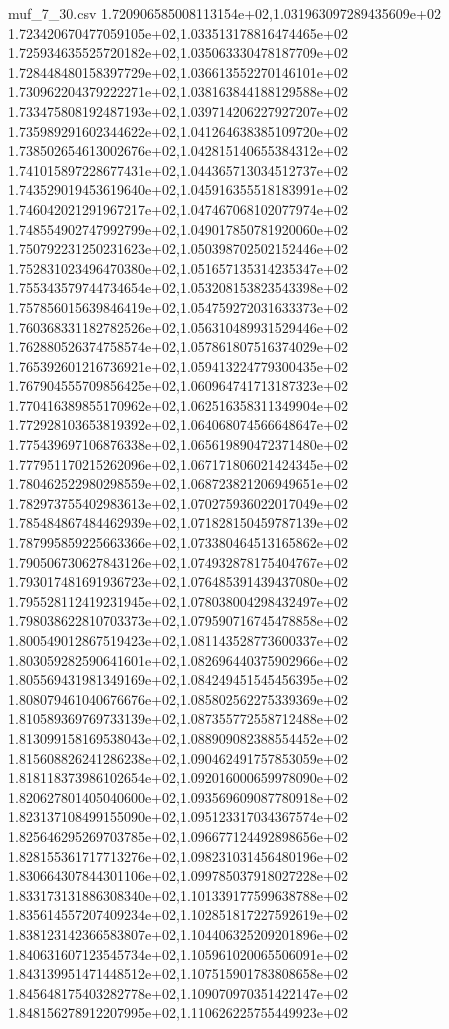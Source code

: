 \begin{filecontents*}{muf_7_30.csv}
1.720906585008113154e+02,1.031963097289435609e+02
1.723420670477059105e+02,1.033513178816474465e+02
1.725934635525720182e+02,1.035063330478187709e+02
1.728448480158397729e+02,1.036613552270146101e+02
1.730962204379222271e+02,1.038163844188129588e+02
1.733475808192487193e+02,1.039714206227927207e+02
1.735989291602344622e+02,1.041264638385109720e+02
1.738502654613002676e+02,1.042815140655384312e+02
1.741015897228677431e+02,1.044365713034512737e+02
1.743529019453619640e+02,1.045916355518183991e+02
1.746042021291967217e+02,1.047467068102077974e+02
1.748554902747992799e+02,1.049017850781920060e+02
1.750792231250231623e+02,1.050398702502152446e+02
1.752831023496470380e+02,1.051657135314235347e+02
1.755343579744734654e+02,1.053208153823543398e+02
1.757856015639846419e+02,1.054759272031633373e+02
1.760368331182782526e+02,1.056310489931529446e+02
1.762880526374758574e+02,1.057861807516374029e+02
1.765392601216736921e+02,1.059413224779300435e+02
1.767904555709856425e+02,1.060964741713187323e+02
1.770416389855170962e+02,1.062516358311349904e+02
1.772928103653819392e+02,1.064068074566648647e+02
1.775439697106876338e+02,1.065619890472371480e+02
1.777951170215262096e+02,1.067171806021424345e+02
1.780462522980298559e+02,1.068723821206949651e+02
1.782973755402983613e+02,1.070275936022017049e+02
1.785484867484462939e+02,1.071828150459787139e+02
1.787995859225663366e+02,1.073380464513165862e+02
1.790506730627843126e+02,1.074932878175404767e+02
1.793017481691936723e+02,1.076485391439437080e+02
1.795528112419231945e+02,1.078038004298432497e+02
1.798038622810703373e+02,1.079590716745478858e+02
1.800549012867519423e+02,1.081143528773600337e+02
1.803059282590641601e+02,1.082696440375902966e+02
1.805569431981349169e+02,1.084249451545456395e+02
1.808079461040676676e+02,1.085802562275339369e+02
1.810589369769733139e+02,1.087355772558712488e+02
1.813099158169538043e+02,1.088909082388554452e+02
1.815608826241286238e+02,1.090462491757853059e+02
1.818118373986102654e+02,1.092016000659978090e+02
1.820627801405040600e+02,1.093569609087780918e+02
1.823137108499155090e+02,1.095123317034367574e+02
1.825646295269703785e+02,1.096677124492898656e+02
1.828155361717713276e+02,1.098231031456480196e+02
1.830664307844301106e+02,1.099785037918027228e+02
1.833173131886308340e+02,1.101339177599638788e+02
1.835614557207409234e+02,1.102851817227592619e+02
1.838123142366583807e+02,1.104406325209201896e+02
1.840631607123545734e+02,1.105961020065506091e+02
1.843139951471448512e+02,1.107515901783808658e+02
1.845648175403282778e+02,1.109070970351422147e+02
1.848156278912207995e+02,1.110626225755449923e+02

\end{filecontents*}

